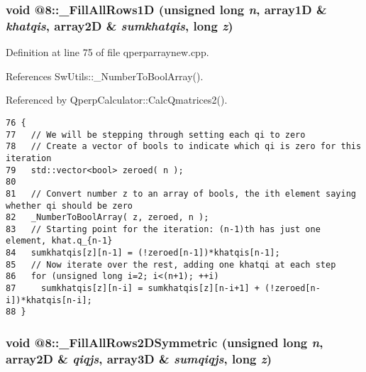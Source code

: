 \subsubsection{\setlength{\rightskip}{0pt plus 5cm}void @8::\_\-FillAllRows1D (unsigned long {\em n}, array1D \& {\em khatqis}, array2D \& {\em sumkhatqis}, long {\em z})\hspace{0.3cm}{\tt  [static]}}\label{qperparraynew_8cpp_6e28f19c83c2c6e49a2672873048fd10}




Definition at line 75 of file qperparraynew.cpp.

References SwUtils::\_\-NumberToBoolArray().

Referenced by QperpCalculator::CalcQmatrices2().

\begin{Code}\begin{verbatim}76 {
77   // We will be stepping through setting each qi to zero
78   // Create a vector of bools to indicate which qi is zero for this iteration
79   std::vector<bool> zeroed( n );
80 
81   // Convert number z to an array of bools, the ith element saying whether qi should be zero
82   _NumberToBoolArray( z, zeroed, n ); 
83   // Starting point for the iteration: (n-1)th has just one element, khat.q_{n-1}
84   sumkhatqis[z][n-1] = (!zeroed[n-1])*khatqis[n-1];
85   // Now iterate over the rest, adding one khatqi at each step
86   for (unsigned long i=2; i<(n+1); ++i)
87     sumkhatqis[z][n-i] = sumkhatqis[z][n-i+1] + (!zeroed[n-i])*khatqis[n-i];
88 }
\end{verbatim}
\end{Code}


\subsubsection{\setlength{\rightskip}{0pt plus 5cm}void @8::\_\-FillAllRows2DSymmetric (unsigned long {\em n}, array2D \& {\em qiqjs}, array3D \& {\em sumqiqjs}, long {\em z})\hspace{0.3cm}{\tt  [static]}}\label{qperparraynew_8cpp_e6e4ce05ca5129920fbf7d9ef0a1e88f}





